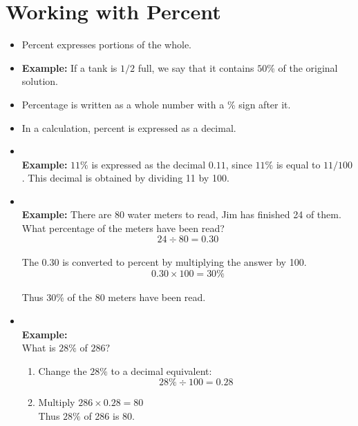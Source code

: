 \section{Working with Percent}
\begin{itemize}
\item Percent expresses portions of the whole.  
\item {}
\textbf{Example:} If a tank is $1 / 2$ full, we say that it contains $50 \%$ of the original solution.
\item Percentage is written as a whole number with a \% sign after it. 
\item In a calculation, percent is expressed as a decimal. 
\item {}\\
 \textbf{Example:} $11 \%$ is expressed as the decimal $0.11$, since $11 \%$ is equal to $11 / 100$. This decimal is obtained by dividing 11 by 100.
\item {}\\
\textbf{Example:} There are 80 water meters to read, Jim has finished 24 of them. What percentage of the meters have been read?\\
$$24 \div 80=0.30$$\\
The $0.30$ is converted to percent by multiplying the answer by 100.\\
$$0.30 \times 100=30 \%$$\\
Thus $30 \%$ of the 80 meters have been read.\\

\item {}\\
\textbf{Example:}\\
What is $28 \%$ of $286 ?$\\

\begin{enumerate}[Step 1.]
\item Change the $28 \%$ to a decimal equivalent:  $$28 \% \div 100=0.28$$
\item Multiply $286 \times 0.28=80$\\
Thus $28 \%$ of 286 is 80.
\end{enumerate}


\end{itemize}

